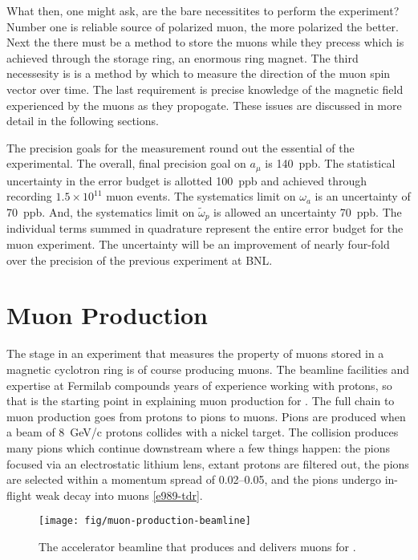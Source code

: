 What then, one might ask, are the bare necessitites to perform the \gmtwo experiment?  Number one is reliable source of polarized muon, the more polarized the better.  Next the there must be a method to store the muons while they precess which is achieved through the \gmtwo storage ring, an enormous ring magnet.  The third necessesity is is a method by which to measure the direction of the muon spin vector over time.  The last requirement is precise knowledge of the magnetic field experienced by the muons as they propogate.  These issues are discussed in more detail in the following sections.

The precision goals for the measurement round out the essential of the experimental.  The overall, final precision goal on $a_\mu$ is \SI{140}{ppb}.  The statistical uncertainty in the error budget is allotted \SI{100}{ppb} and achieved through recording $1.5\times10^{11}$ muon events.  The systematics limit on $\omega_a$ is an uncertainty of \SI{70}{ppb}.  And, the systematics limit on $\tilde{\omega}_p$ is allowed an uncertainty \SI{70}{ppb}.  The individual terms summed in quadrature represent the entire error budget for the muon \gmtwo experiment.  The uncertainty will be an improvement of nearly four-fold over the precision of the previous experiment at BNL.

\section{Muon Production} \label{sec:muon-production}

The stage in an experiment that measures the property of muons stored in a magnetic cyclotron ring is of course producing muons.  The beamline facilities and expertise at Fermilab compounds years of experience working with protons, so that is the starting point in explaining muon production for \gmtwo.  The full chain to muon production goes from protons to pions to muons.  Pions are produced when a beam of \SI{8}{\GeV/c} protons collides with a nickel target.  The collision produces many pions which continue downstream where a few things happen: the pions focused via an electrostatic lithium lens, extant protons are filtered out, the pions are selected within a momentum spread of \SIrange{0.02}{0.05}{}, and the pions undergo in-flight weak decay into muons \ref{e989-tdr}.

\begin{figure}
\label{fig:muon-production-beamline}
\texttt{[image: fig/muon-production-beamline]}
\caption{The accelerator beamline that produces and delivers muons for \gmtwo. }
\end{figure}


